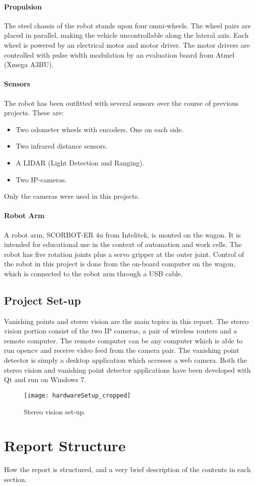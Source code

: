 \paragraph{Propulsion}

The steel chassis of the robot stands upon four omni-wheels. The wheel pairs are placed in parallel, making the vehicle uncontrollable along the lateral axis. Each wheel is powered by an electrical motor and motor driver. The motor drivers are controlled with pulse width modulation by an evaluation board from Atmel (Xmega A3BU).  

\paragraph{Sensors}

The robot has been outfitted with several sensors over the course of previous projects. These are:
\begin{itemize}
	\item Two odometer wheels with encoders. One on each side. 
	\item Two infrared distance sensors. 
	\item A LIDAR (Light Detection and Ranging).
	\item Two IP-cameras.
\end{itemize} 

Only the cameras were used in this projects. 

\paragraph{Robot Arm}

A robot arm, SCORBOT-ER 4u from Intelitek, is monted on the wagon. It is intended for educational use in the context of automation and work cells. The robot has five rotation joints plus a servo gripper at the outer joint. Control of the robot in this project is done from the on-board computer on the wagon, which is connected to the robot arm through a USB cable. 


\subsection{Project Set-up}

Vanishing points and stereo vision are the main topics in this report. The stereo vision portion consist of the two IP cameras, a pair of wireless routers and a remote computer. The remote computer can be any computer which is able to run \gls{opencv} and receive video feed from the camera pair. The vanishing point detector is simply a desktop application which accesses a web camera. Both the stereo vision and vanishing point detector applications have been developed with Qt and run on Windows 7.

\begin{figure}
	\texttt{[image: hardwareSetup\_cropped]}
	\caption{\label{fig:hardware}Stereo vision set-up.}
\end{figure}

\section{Report Structure}
How the report is structured, and a very brief description of the contents in each section.